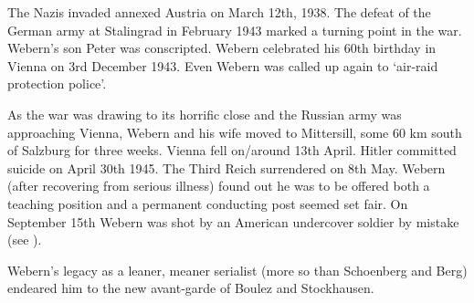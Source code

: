 The Nazis invaded annexed Austria on March 12th, 1938. The defeat of the German army at Stalingrad in February 1943 marked a turning point in the war. Webern's son Peter was conscripted. Webern celebrated his 60th birthday in Vienna on 3rd December 1943. Even Webern was called up again to `air-raid protection police'.  

As the war was drawing to its horrific close and the Russian army was approaching Vienna, Webern and his wife moved to Mittersill, some 60 km south of Salzburg for three weeks. Vienna fell on/around 13th April. Hitler committed suicide on April 30th 1945. The Third Reich surrendered on 8th May. Webern (after recovering from serious illness) found out he was to be offered both a teaching position and a permanent conducting post seemed set fair. On September 15th Webern was shot by an American undercover soldier by mistake (see \citep[p216]{hayes1995anton}). 

Webern's legacy as a leaner, meaner serialist (more so than Schoenberg and Berg) endeared him to the new avant-garde of Boulez and Stockhausen. 

